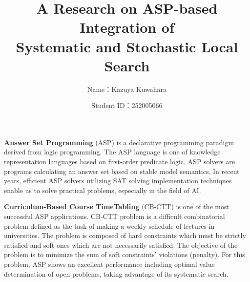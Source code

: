 \documentclass[dvipdfmx,a4paper]{jsarticle}
\title{A Research on ASP-based Integration of\\
Systematic and Stochastic Local Search}
\author{Name：Kazuya Kuwahara}
\date{Student ID：252005066}
\begin{document}
\maketitle


\textbf{Answer Set Programming} (ASP) is 
a declarative programming paradigm derived from 
logic programming. 
The ASP language is one of 
knowledge representation languages 
based on first-order predicate logic. 
ASP solvers are programs 
calculating an answer set based on stable model semantics. 
In recent years, 
efficient ASP solvers utilizing 
SAT solving implementation techniques 
enable us to solve practical problems, 
especially in the field of AI.


\textbf{Curriculum-Based Course TimeTabling} (CB-CTT) 
is one of the most successful 
ASP applications. 
CB-CTT problem is 
a difficult combinatorial problem 
defined as the task of 
making a weekly schedule of 
lectures in universities. 
The problem is composed of 
hard constraints which must be strictly satisfied 
and soft ones which are not necessarily satisfied. 
The objective of the problem is 
to minimize the sum of soft constraints' 
violations (penalty). 
For this problem, 
ASP shows an excellent performance 
including optimal value determination 
of open problems, 
taking advantage of its systematic search.

\end{document}
